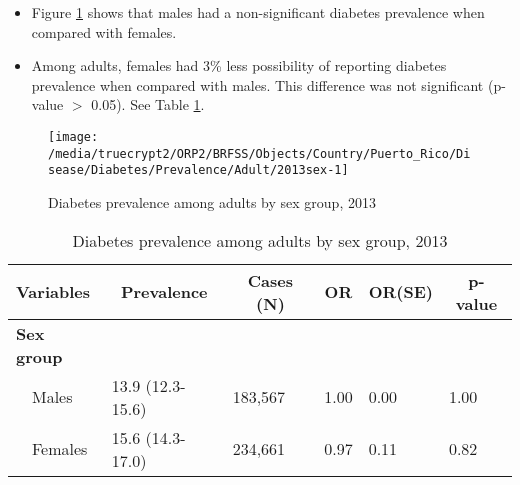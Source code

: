 \newpage
\begin{itemize}

\item Figure \ref{fig:sex.Diabetes.2013} shows that males had a non-significant 
diabetes prevalence when compared with females.


\item Among adults, females had 3\% less possibility of reporting diabetes prevalence when compared with males. This difference was not significant (p-value $>$ 0.05). See Table \ref{tab:sex.Diabetes.2013}.

\end{itemize}

\begin{figure}[H]
\caption{Diabetes prevalence among adults by sex group, 
2013}
\begin{knitrout}
\color{fgcolor}

{\centering \texttt{[image: /media/truecrypt2/ORP2/BRFSS/Objects/Country/Puerto\_Rico/Disease/Diabetes/Prevalence/Adult/2013sex-1]} 

}



\end{knitrout}
\label{fig:sex.Diabetes.2013}
\end{figure}

\begin{table}[H]
\caption{Diabetes prevalence  among adults by sex group, 2013\label{tab:sex.Diabetes.2013}} 
\begin{center}
\begin{tabular}{llllll}
\hline\hline
\multicolumn{1}{l}{Variables}&\multicolumn{1}{c}{Prevalence}&\multicolumn{1}{c}{Cases (N)}&\multicolumn{1}{c}{OR}&\multicolumn{1}{c}{OR(SE)}&\multicolumn{1}{c}{p-value}\tabularnewline
\hline
{\bfseries Sex group}&&&&&\tabularnewline
~~Males&13.9 (12.3-15.6)&183,567&1.00&0.00&1.00\tabularnewline
~~Females&15.6 (14.3-17.0)&234,661&0.97&0.11&0.82\tabularnewline
\hline
\end{tabular}\end{center}

\end{table}


